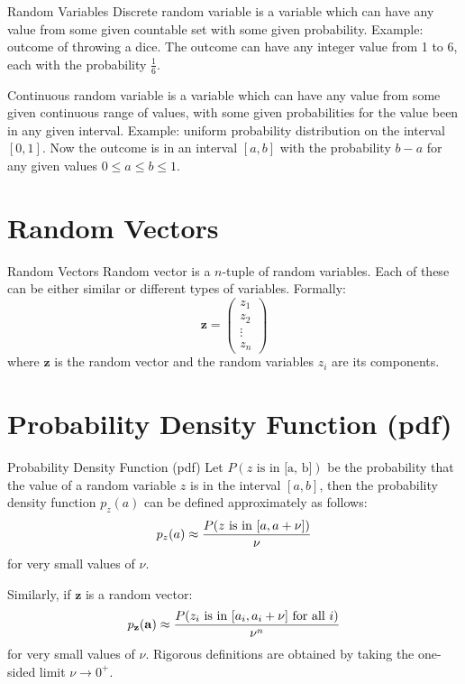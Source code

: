 \documentclass{beamer}
\begin{document}
\begin{frame}{Random Variables}
 Discrete random variable is a variable which can have any value from some given
 countable set with some given probability. Example: outcome of throwing a dice.
 The outcome can have any integer value from 1 to 6, each with the probability
 $\frac{1}{6}$.

 Continuous random variable is a variable which can have any value from some given
 continuous range of values, with some given probabilities for the value been in
 any given interval. Example: uniform probability distribution on the interval
 $[0, 1]$. Now the outcome is in an interval $[a, b]$ with the probability $b-a$
 for any given values $0 \le a \le b \le 1$.
\end{frame}

\section{Random Vectors}

\begin{frame}{Random Vectors}
  Random vector is a $n$-tuple of random variables. Each of these can be either
  similar or different types of variables. Formally:
  \[ \mathbf{z} =  \begin{pmatrix} z_1 \\ z_2 \\ \vdots \\ z_n \end{pmatrix} \]
  where $\mathbf{z}$ is the random vector and the random variables $z_i$ are
  its components.
\end{frame}

\section{Probability Density Function (pdf)}

\begin{frame}{Probability Density Function (pdf)}
  Let $P(\text{$z$ is in [a, b]})$ be the probability that the value of a
  random variable $z$ is in the interval $[a, b]$, then the probability density
  function $p_z(a)$ can be defined approximately as follows:
  \[ p_z(a) \approx \frac{P(\textnormal{$z$ is in $[a, a + \nu]$})}{\nu}\]
  for very small values of $\nu$.

  Similarly, if $\mathbf{z}$ is a random vector:
  \[ p_{\mathbf{z}}(\mathbf{a}) \approx
  \frac{P(\textnormal{$z_i$ is in $[a_i, a_i + \nu]$ for all $i$})}{\nu^n}\]
  for very small values of $\nu$. Rigorous definitions are obtained by taking
  the one-sided limit $\nu \to 0^+$.
\end{frame}
\end{document}
